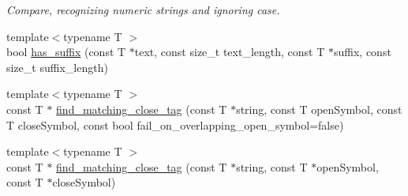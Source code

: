 \begin{DoxyCompactItemize}
\begin{DoxyCompactList}\small\item\em Compare, recognizing numeric strings and ignoring case. \end{DoxyCompactList}\item 
{\footnotesize template$<$typename T $>$ }\\bool \hyperlink{namespacestring__util_a5872d5326e0b533b26919bbf5164a569}{has\-\_\-suffix} (const T $\ast$text, const size\-\_\-t text\-\_\-length, const T $\ast$suffix, const size\-\_\-t suffix\-\_\-length)
\item 
{\footnotesize template$<$typename T $>$ }\\const T $\ast$ \hyperlink{namespacestring__util_aec324c3f924477c042945e350ce9164f}{find\-\_\-matching\-\_\-close\-\_\-tag} (const T $\ast$string, const T open\-Symbol, const T close\-Symbol, const bool fail\-\_\-on\-\_\-overlapping\-\_\-open\-\_\-symbol=false)
\item 
\hypertarget{namespacestring__util_aca49ee9759c52a930b15816f643f1085}{{\footnotesize template$<$typename T $>$ }\\const T $\ast$ \hyperlink{namespacestring__util_aca49ee9759c52a930b15816f643f1085}{find\-\_\-matching\-\_\-close\-\_\-tag} (const T $\ast$string, const T $\ast$open\-Symbol, const T $\ast$close\-Symbol)}\label{namespacestring__util_aca49ee9759c52a930b15816f643f1085}


\end{DoxyCompactItemize}
